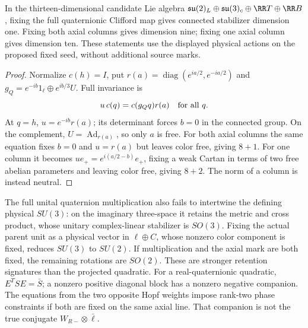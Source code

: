 \documentclass[12pt,a4paper]{article}
\begin{document}
\begin{proposition}
\label{p5:prop:full-seed-stabilizer-tests}
In the thirteen-dimensional candidate Lie algebra
\(\mathfrak{su}(2)_L\oplus\mathfrak{su}(3)_c
\oplus\RR T\oplus\RR B\), fixing the full quaternionic
Clifford map gives connected stabilizer dimension one.
Fixing both axial columns gives dimension nine; fixing
one axial column gives dimension ten.  These statements
use the displayed physical actions on the proposed fixed
seed, without additional source marks.
\end{proposition}
\begin{proof}
Normalize \(c(h)=I\), put
\(r(a)=\operatorname{diag}(e^{ia/2},e^{-ia/2})\) and
\(g_Q=e^{-ib}1_\ell\oplus e^{ib/3}U\).
Full invariance is
\[
 u\,c(q)=c(g_Qq)r(a)\quad\hbox{for all }q.
\]
At \(q=h\), \(u=e^{-ib}r(a)\); its determinant forces
\(b=0\) in the connected group.  On the complement,
\(U=\operatorname{Ad}_{r(a)}\), so only \(a\) is free.
For both axial columns the same equation fixes \(b=0\)
and \(u=r(a)\) but leaves color free, giving \(8+1\).
For one column it becomes
\(ue_+=e^{i(a/2-b)}e_+\), fixing a weak Cartan in terms
of two free abelian parameters and leaving color free,
giving \(8+2\).  The norm of a column is instead neutral.
\end{proof}

The full unital quaternion multiplication also fails to
intertwine the defining physical \(SU(3)\): on the imaginary
three-space it retains the metric and cross product, whose
unitary complex-linear stabilizer is \(SO(3)\).
Fixing the actual parent unit as a physical vector in
\(\ell\oplus C\), whose nonzero color component is fixed,
reduces \(SU(3)\) to \(SU(2)\).  If multiplication and the
axial mark are both fixed, the remaining rotations are
\(SO(2)\).  These are stronger retention signatures than
the projected quadratic.  For a real-quaternionic quadratic,
\(E^TSE=\bar S\); a nonzero positive diagonal block has
a nonzero negative companion.  The equations from the
two opposite Hopf weights impose rank-two phase
constraints if both are fixed on the same axial line.
That companion is not the true conjugate
\(W_{R-}\otimes\bar\ell\).
\end{document}
